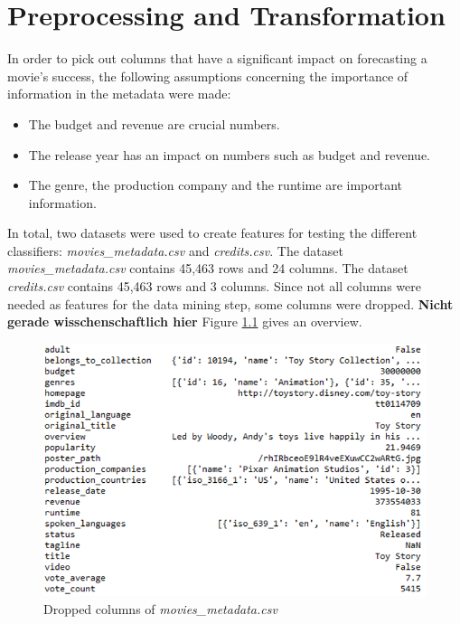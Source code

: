 \chapter{Preprocessing and Transformation}
\label{cha:preprocessing_transformation}

In order to pick out columns that have a significant impact on forecasting a movie's success, the following assumptions concerning the importance of information in the metadata were made:
\begin{itemize}
	\item The budget and revenue are crucial numbers.
	\item The release year has an impact on numbers such as budget and revenue.
	\item The genre, the production company and the runtime are important information.
\end{itemize}

In total, two datasets were used to create features for testing the different classifiers:
\textit{movies\_metadata.csv} and \textit{credits.csv}. The dataset \textit{movies\_metadata.csv} contains 45,463 rows and 24 columns. The dataset \textit{credits.csv} contains 45,463 rows and 3 columns. Since not all columns were needed as features for the data mining step, some columns were dropped. \textbf{Nicht gerade wisschenschaftlich hier} Figure \ref{img:mm_columns} gives an overview.

\begin{figure}
	\includegraphics[width=\textwidth]{images/3_metadata_columns.png}
	\caption{Dropped columns of \textit{movies\_metadata.csv}}
	\label{img:mm_columns}
\end{figure}



